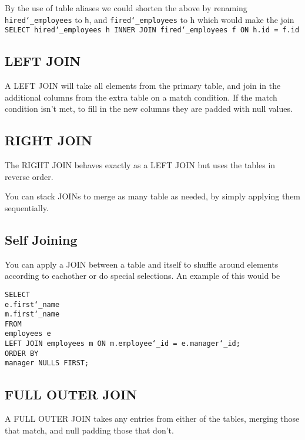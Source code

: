 \documentclass[10pt, english]{article}
\begin{document}
By the use of table aliases we could shorten the above by renaming \texttt{hired\char`_employees} to \texttt{h}, and
\texttt{fired\char`_employees} to h which would make the join \texttt{SELECT hired\char`_employees h INNER JOIN fired\char`_employees f ON h.id = f.id}

\subsection{LEFT JOIN}
A LEFT JOIN will take all elements from the primary table, and join in the additional columns from the extra table on a match condition. If the match condition isn't met, to fill in the new columns they are padded with null values.

\subsection{RIGHT JOIN}
The RIGHT JOIN behaves exactly as a LEFT JOIN but uses the tables in reverse order.

You can stack JOINs to merge as many table as needed, by simply applying them sequentially.

\subsection{Self Joining}
You can apply a JOIN between a table and itself to shuffle around elements according to eachother or do special selections. An example of this would be

\texttt{SELECT\\
\hspace*{10pt} e.first\char`_name \\
\hspace*{10pt} m.first\char`_name \\
FROM \\
\hspace*{10pt} employees e\\
\hspace*{10pt} LEFT JOIN employees m ON m.employee\char`_id = e.manager\char`_id; \\
ORDER BY \\
\hspace*{10pt} manager NULLS FIRST;
}


\subsection{FULL OUTER JOIN}
A FULL OUTER JOIN takes any entries from either of the tables, merging those that match, and null padding those that don't.
\end{document}
